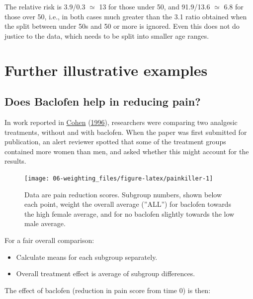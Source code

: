 \documentclass[
  10pt,
  b5paper]{book}
\providecommand{\tightlist}{%
  \setlength{\itemsep}{0pt}\setlength{\parskip}{0pt}}
\begin{document}
The relative risk is 3.9/0.3 \(\simeq\) 13 for those under 50,
and 91.9/13.6 \(\simeq\) 6.8 for those over 50, i.e., in both
cases much greater than the 3.1 ratio obtained when the
split between under 50s and 50 or more is ignored.
Even this does not do justice to the data, which needs to
be split into smaller age ranges.

\hypertarget{further-illustrative-examples}{%
\section{Further illustrative examples}\label{further-illustrative-examples}}

\hypertarget{does-baclofen-help-in-reducing-pain}{%
\subsection*{Does Baclofen help in reducing pain?}\label{does-baclofen-help-in-reducing-pain}}

In work reported in \protect\hyperlink{ref-cohen1996}{Cohen} (\protect\hyperlink{ref-cohen1996}{1996}), researchers were comparing two
analgesic treatments, without and with baclofen. When the paper was
first submitted for publication, an alert reviewer spotted that some
of the treatment groups contained more women than men, and asked
whether this might account for the
results.

\begin{figure}[H]

{\centering \texttt{[image: 06-weighting\_files/figure-latex/painkiller-1]} 

}

\caption{Data are pain reduction scores. Subgroup numbers, shown
    below each point, weight the overall average (''ALL'') for
    baclofen towards the high female average, and for no baclofen
    slightly towards the low male average.}\label{fig:painkiller}
\end{figure}

For a fair overall comparison:

\begin{itemize}
\tightlist
\item
  Calculate means for each subgroup separately.
\item
  Overall treatment effect is average of subgroup differences.
\end{itemize}

The effect of baclofen (reduction in pain score from time 0) is then:
\end{document}
